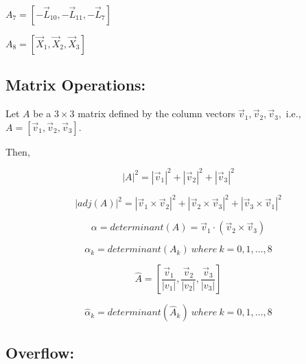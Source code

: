 \documentclass[12pt]{article}
\begin{document}
\begin{center}
$A_7 = [ -\vec L_{10}, -\vec L_{11}, -\vec L_7 ]$
\end{center}

\begin{center}
$A_8 = [ \vec X_1, \vec X_2, \vec X_3 ]$
\end{center}

\subsection*{Matrix Operations:}

Let $A$ be a $3 \times 3$ matrix defined by the column vectors $\vec v_1, \vec v_2, \vec v_3,$ i.e., $A = [\vec v_1, \vec v_2, \vec v_3]$. 

\begin{flushleft}
Then, 
\end{flushleft}

\begin{displaymath}
|A|^2 = |\vec v_1|^2 + |\vec v_2|^2 + |\vec v_3|^2 
\end{displaymath}

\begin{displaymath}
|adj(A)|^2 = |\vec v_1 \times \vec v_2|^2 + 
             |\vec v_2 \times \vec v_3|^2 +
             |\vec v_3 \times \vec v_1|^2  
\end{displaymath}

\begin{displaymath}
\alpha = determinant(A) = \vec v_1 \cdot (\vec v_2 \times \vec v_3 )
\end{displaymath}

\begin{displaymath}
\alpha_k = determinant(A_k) ~ where ~ k=0,1,...,8
\end{displaymath}

\begin{displaymath}
\hat{A} = \left[ \frac {\vec v_1} {|v_1|}, 
                 \frac {\vec v_2} {|v_2|},
                 \frac {\vec v_3} {|v_3|} \right] 
\end{displaymath}

\begin{displaymath}
\hat \alpha_k = determinant(\hat A_k) ~ where ~ k=0,1,...,8
\end{displaymath}

\subsection*{Overflow:}
\end{document}
